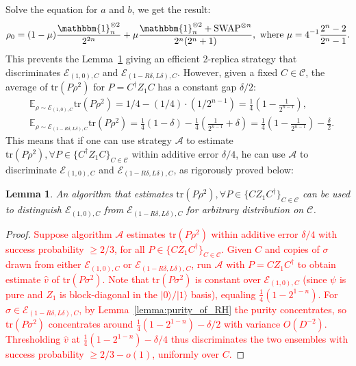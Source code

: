 \documentclass[aps,%
twocolumn,%
floatfix,%
pra,%
amsfonts,%
groupedaddress,%
superscriptaddress]{revtex4-2}%
\newtheorem{lemma}{Lemma}
\newcommand{\ket}[1]{\lvert #1\rangle}
\newcommand{\1}{\mathbbm{1}}
\begin{document}
Solve the equation for $a$ and $b$, we get the result:
\begin{align}
    \rho_0 = (1 - \mu)  \frac{\1_n^{\otimes 2}}{2^{2n}} + \mu \frac{\1_n^{\otimes 2} + \mathrm{SWAP}^{\otimes n}}{2^n(2^{n} + 1)}, \text{~where~} \mu = 4^{-1} \frac{2^n -2}{2^n - 1}.
\end{align}
This prevents the Lemma~\ref{lemma:hard_necess1} giving an efficient 2-replica strategy that discriminates $\mathcal{E}_{(1,0),C} $ and $\mathcal{E}_{(1 - R\delta,L\delta),C} $.
However, given a fixed $C \in \mathcal{C}$, the average of $\mathrm{tr}(P \rho^2)$ for $P = C^\dagger Z_1 C$ has a constant gap $\delta/2$:
\begin{align}
    &\mathbb{E}_{\rho \sim \mathcal{E}_{(1,0),C}} \mathrm{tr}\left(P\rho^{2}\right) = 1/4 -  (1/4) \cdot (1/2^{n-1}) = \frac{1}{4}\left(1- \frac{1}{2^{n-1}}\right) ,\\
    &\mathbb{E}_{\rho \sim \mathcal{E}_{(1 - R\delta,L\delta),C}} \mathrm{tr}\left(P\rho^{2}\right)  = \frac{1}{4}(1 - \delta) - \frac{1}{4}(\frac{1}{2^{n-1}} + \delta) = \frac{1}{4}\left(1- \frac{1}{2^{n-1}}\right) - \frac{\delta}{2}.
\end{align}
This means that if one can use strategy $\mathcal{A}$ to estimate $\mathrm{tr}(P \rho^2), \forall P \in \{C^\dagger Z_1 C\}_{C \in \mathcal{C}}$ within additive error $\delta/4$, he can use $\mathcal{A}$ to discriminate $\mathcal{E}_{(1,0),C} $ and $\mathcal{E}_{(1 - R\delta,L\delta),C} $, as rigorously proved below:
\begin{lemma}\label{lemma:hard_necess1}
    An algorithm that estimates $\mathrm{tr}(P \rho^2), \forall P \in \{C Z_1 C^\dagger\}_{C \in \mathcal{C}}$ can be used to distinguish $\mathcal{E}_{(1,0),C} $ from $\mathcal{E}_{(1 - R\delta,L\delta),C} $ for arbitrary distribution on $\mathcal{C}$.
\end{lemma}
\begin{proof}
    \textcolor{red}{Suppose algorithm $\mathcal{A}$ estimates $\mathrm{tr}(P\rho^2)$ within additive error $\delta/4$ with success probability $\geq 2/3$, for all $P \in \{CZ_1C^\dagger\}_{C \in \mathcal{C}}$. Given $C$ and copies of $\sigma$ drawn from either $\mathcal{E}_{(1,0),C}$ or $\mathcal{E}_{(1-R\delta,L\delta),C}$, run $\mathcal{A}$ with $P = CZ_1C^\dagger$ to obtain estimate $\hat{v}$ of $\mathrm{tr}(P\sigma^2)$. Note that $\mathrm{tr}(P\sigma^2)$ is constant over $\mathcal{E}_{(1,0),C}$ (since $\psi$ is pure and $Z_1$ is block-diagonal in the $\ket{0}/\ket{1}$ basis), equaling $\frac{1}{4}(1 - 2^{1-n})$. For $\sigma \in \mathcal{E}_{(1-R\delta,L\delta),C}$, by Lemma~\ref{lemma:purity_of_RH} the purity concentrates, so $\mathrm{tr}(P\sigma^2)$ concentrates around $\frac{1}{4}(1 - 2^{1-n}) - \delta/2$ with variance $O(D^{-2})$. Thresholding $\hat{v}$ at $\frac{1}{4}(1 - 2^{1-n}) - \delta/4$ thus discriminates the two ensembles with success probability $\geq 2/3 - o(1)$, uniformly over $C$.}
\end{proof}
\end{document}
